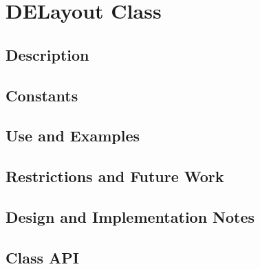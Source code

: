 \documentclass[english]{article}
\begin{document}
\section{DELayout Class}
\subsection{Description}

\subsection{Constants}

\subsection{Use and Examples}


\subsection{Restrictions and Future Work}

\subsection{Design and Implementation Notes}

\subsection{Class API}

%
%
%
\end{document}
